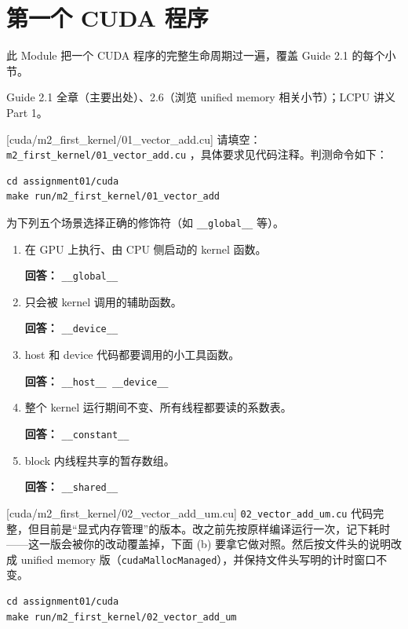 \documentclass[11pt,a4paper,fontset=windows]{ctexart}
\begin{document}
\section{第一个 CUDA 程序}

此 Module 把一个 CUDA 程序的完整生命周期过一遍，覆盖 Guide 2.1 的每个小节。

\begin{reading}
Guide 2.1 全章（主要出处）、2.6（浏览 unified memory 相关小节）；LCPU 讲义 Part 1。
\end{reading}

[cuda/m2\_first\_kernel/01\_vector\_add.cu]
请填空：\texttt{m2\_first\_kernel/01\_vector\_add.cu} ，具体要求见代码注释。判测命令如下：

\begin{lstlisting}
cd assignment01/cuda
make run/m2_first_kernel/01_vector_add
\end{lstlisting}

为下列五个场景选择正确的修饰符（如 \texttt{\_\_global\_\_} 等）。
\begin{enumerate}[label=(\alph*)]
  \item 在 GPU 上执行、由 CPU 侧启动的 kernel 函数。
  \par\textbf{回答：} \texttt{\_\_global\_\_}
  \item 只会被 kernel 调用的辅助函数。
  \par\textbf{回答：} \texttt{\_\_device\_\_}
  \item host 和 device 代码都要调用的小工具函数。
  \par\textbf{回答：} \texttt{\_\_host\_\_ \_\_device\_\_}
  \item 整个 kernel 运行期间不变、所有线程都要读的系数表。
  \par\textbf{回答：} \texttt{\_\_constant\_\_}
  \item block 内线程共享的暂存数组。
  \par\textbf{回答：} \texttt{\_\_shared\_\_}
\end{enumerate}

[cuda/m2\_first\_kernel/02\_vector\_add\_um.cu]
\texttt{02\_vector\_add\_um.cu} 代码完整，但目前是“显式内存管理”的版本。改之前先按原样编译运行一次，记下耗时——这一版会被你的改动覆盖掉，下面 (b) 要拿它做对照。然后按文件头的说明改成 unified memory 版（\texttt{cudaMallocManaged}），并保持文件头写明的计时窗口不变。

\begin{lstlisting}
cd assignment01/cuda
make run/m2_first_kernel/02_vector_add_um
\end{lstlisting}
\end{document}
